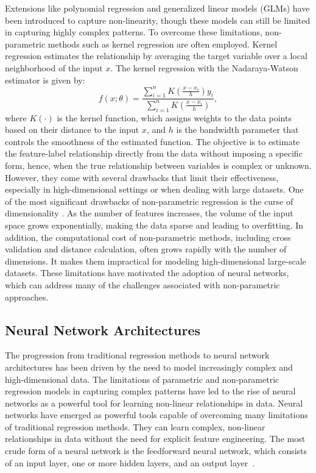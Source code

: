 Extensions like polynomial regression and generalized linear models (GLMs) have been introduced to capture non-linearity, though these models can still be limited in capturing highly complex patterns. 
To overcome these limitations, non-parametric methods such as kernel regression \citep{hastie2009elements} are often employed. 
Kernel regression estimates the relationship by averaging the target variable over a local neighborhood of the input $x$.
The kernel regression with the Nadaraya-Watson estimator is given by:
\begin{equation}
    f(x; \theta) = \frac{\sum_{i=1}^{n} K\left(\frac{x-x_i}{h}\right) y_i}{\sum_{i=1}^{n} K\left(\frac{x-x_i}{h}\right)},
\end{equation}
where $K(\cdot)$ is the kernel function, which assigns weights to the data points based on their distance to the input $x$, and $h$ is the bandwidth parameter that controls the smoothness of the estimated function.
The objective is to estimate the feature-label relationship directly from the data without imposing a specific form, hence, when the true relationship between variables is complex or unknown.
However, they come with several drawbacks that limit their effectiveness, especially in high-dimensional settings or when dealing with large datasets. 
One of the most significant drawbacks of non-parametric regression is the curse of dimensionality \cite{bellman1966dynamic}. 
As the number of features increases, the volume of the input space grows exponentially, making the data sparse and leading to overfitting.
In addition, the computational cost of non-parametric methods, including cross validation and distance calculation, often grows rapidly with the number of dimensions.
It makes them impractical for modeling high-dimensional large-scale datasets. 
These limitations have motivated the adoption of neural networks, which can address many of the challenges associated with non-parametric approaches.

\subsection{Neural Network Architectures}

The progression from traditional regression methods to neural network architectures has been driven by the need to model increasingly complex and high-dimensional data.
The limitations of parametric and non-parametric regression models in capturing complex patterns have led to the rise of neural networks as a powerful tool for learning non-linear relationships in data.
Neural networks have emerged as powerful tools capable of overcoming many limitations of traditional regression methods. 
They can learn complex, non-linear relationships in data without the need for explicit feature engineering.
The most crude form of a neural network is the feedforward neural network, which consists of an input layer, one or more hidden layers, and an output layer~\citep{goodfellow2016}.

